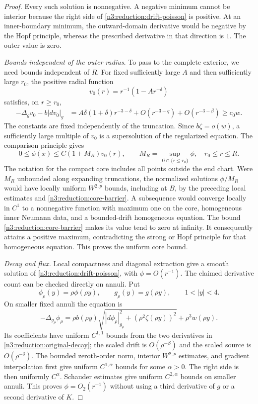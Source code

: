 \begin{proof}
Every such solution is nonnegative.  A negative minimum cannot be
interior because the right side of
\eqref{n3:reduction:drift-poisson} is positive.  At an inner-boundary
minimum, the outward-domain derivative would be negative by the Hopf
principle, whereas the prescribed derivative in that direction is $1$.
The outer value is zero.

\emph{Bounds independent of the outer radius.} To pass to the complete
exterior, we need bounds independent of $R$. For fixed sufficiently large
$A$ and then sufficiently large $r_0$, the positive radial function
\[
 v_0(r)=r^{-1}(1-Ar^{-\delta})
\]
satisfies, on $r\ge r_0$,
\begin{align*}
 -\Delta_gv_0-b|dv_0|_g
 &=A\delta(1+\delta)r^{-3-\delta}
       +O(r^{-3-q})+O(r^{-3-\beta})\ge c_0w.
\end{align*}
The constants are fixed independently of the truncation.  Since
$b\zeta=o(w)$, a sufficiently large multiple of $v_0$ is a supersolution
of the regularized equation.  The comparison principle gives
\begin{equation}
 \label{n3:reduction:core-barrier}
 0\le\phi(x)\le C(1+M_R)v_0(r),\qquad
 M_R=\sup_{\Omega\cap\{r\le r_0\}}\phi,
 \quad r_0\le r\le R.
\end{equation}
The notation for the compact core includes all points outside the end
chart.  Were $M_R$ unbounded along expanding truncations, the normalized
solutions $\phi/M_R$ would have locally uniform $W^{2,p}$ bounds, including
at $B$, by the preceding local estimates and
\eqref{n3:reduction:core-barrier}.  A subsequence would converge
locally in $C^1$ to a nonnegative function with maximum one on the core,
homogeneous inner Neumann data, and a bounded-drift homogeneous equation.
The bound \eqref{n3:reduction:core-barrier} makes its value tend to zero at
infinity.  It consequently attains a positive maximum, contradicting the
strong or Hopf principle for that homogeneous equation.  This proves the
uniform core bound.

\emph{Decay and flux.} Local compactness and diagonal extraction give
a smooth solution of
\eqref{n3:reduction:drift-poisson}, with $\phi=O(r^{-1})$.
The claimed derivative count can be checked directly on annuli.  Put
\[
 \phi_{\rho}(y)=\rho\phi(\rho y),\qquad
 g_{\rho}(y)=g(\rho y),\qquad 1<|y|<4.
\]
On smaller fixed annuli the equation is
\[
 -\Delta_{g_{\rho}}\phi_{\rho}
 =\rho b(\rho y)
       \sqrt{|d\phi_{\rho}|_{g_{\rho}}^2+
                     (\rho^2\zeta(\rho y))^2}
       +\rho^3w(\rho y).
\]
Its coefficients have uniform $C^{1,1}$ bounds from the two derivatives
in \eqref{n3:reduction:original-decay}; the scaled drift is
$O(\rho^{-\beta})$ and the scaled source is $O(\rho^{-\delta})$.
The bounded zeroth-order norm, interior $W^{2,p}$ estimates, and gradient
interpolation first give uniform $C^{1,\alpha}$ bounds for some
$\alpha>0$.  The right side is then uniformly $C^\alpha$.  Schauder
estimates give uniform $C^{2,\alpha}$ bounds on smaller annuli.  This
proves $\phi=O_2(r^{-1})$ without using a third derivative of $g$ or a
second derivative of $K$.


\end{proof}
